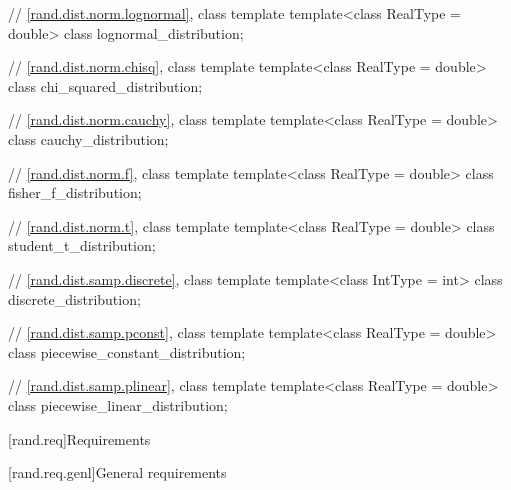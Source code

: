 \begin{codeblock}
{  // \ref{rand.dist.norm.lognormal}, class template 
  template<class RealType = double>
    class lognormal_distribution;

  // \ref{rand.dist.norm.chisq}, class template 
  template<class RealType = double>
    class chi_squared_distribution;

  // \ref{rand.dist.norm.cauchy}, class template 
  template<class RealType = double>
    class cauchy_distribution;

  // \ref{rand.dist.norm.f}, class template 
  template<class RealType = double>
    class fisher_f_distribution;

  // \ref{rand.dist.norm.t}, class template 
  template<class RealType = double>
    class student_t_distribution;

  // \ref{rand.dist.samp.discrete}, class template 
  template<class IntType = int>
    class discrete_distribution;

  // \ref{rand.dist.samp.pconst}, class template 
  template<class RealType = double>
    class piecewise_constant_distribution;

  // \ref{rand.dist.samp.plinear}, class template 
  template<class RealType = double>
    class piecewise_linear_distribution;
}
\end{codeblock}%
%



[rand.req]{Requirements}%


[rand.req.genl]{General requirements}%

